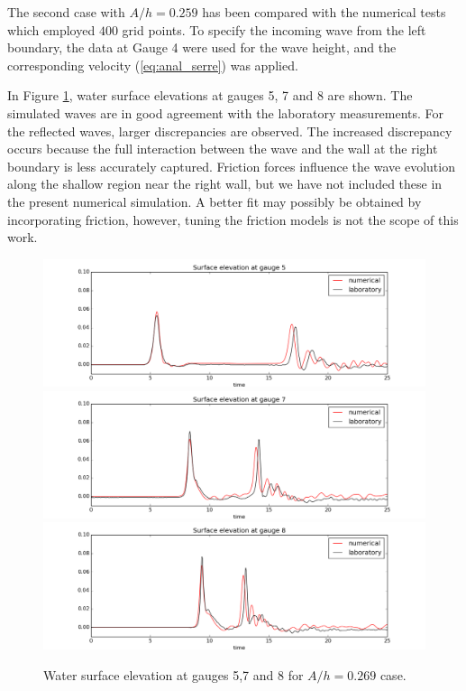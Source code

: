 \documentclass[review]{elsarticle}
\begin{document}
The second case with $A/h=0.259$ has been 
compared with the numerical tests
which employed $400$ grid points. 
To specify the incoming wave from the left boundary, 
the data at Gauge 4 were used for the wave height,
and the corresponding velocity (\ref{eq:anal_serre})
was applied.

In Figure \ref{fig:bp5b_gauges}, water surface elevations at gauges 5, 7 and 8 are shown. 
The simulated waves are in good agreement with the laboratory measurements. 
For the reflected waves, larger discrepancies are observed.
The increased discrepancy occurs because the full interaction between the wave and the wall
at the right boundary is less accurately captured.
Friction forces influence the wave evolution along the shallow region near the right wall,
but we have not included these in the present numerical simulation.
A better fit may possibly be obtained by incorporating friction, however,
tuning the friction models is not the scope of this work. 

\begin{figure}[!htb]
\centering
\includegraphics[width=.8\textwidth]{_fig/gauge0005fig300.png}\\
\includegraphics[width=.8\textwidth]{_fig/gauge0007fig300.png}\\
\includegraphics[width=.8\textwidth]{_fig/gauge0008fig300.png}
\caption{Water surface elevation at gauges 5,7 and 8 for $A/h=0.269$ case.}
\label{fig:bp5b_gauges}
\end{figure}
\end{document}
